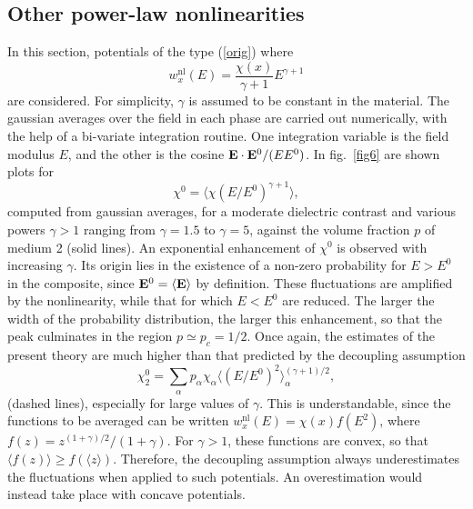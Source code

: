 \subsection{Other power-law nonlinearities}
In this section, potentials of the type (\ref{orig}) 
where \cite{AHAR87}
\begin{equation}
w^{\text{nl}}_x(E)=\frac{\chi(x)}{\gamma+1}E^{\gamma+1}
\end{equation}
are considered. For simplicity, $\gamma$ is assumed to be 
constant in the material. The gaussian averages over the 
field in each phase are carried out numerically, with the 
help of a bi-variate integration routine. One integration 
variable is the field modulus $E$, and the other is the 
cosine ${\mathbf E}\cdot{\bf E}^0/(E E^0)$. In fig.\ 
\ref{fig6} are shown plots for \begin{equation}
\label{directg}
\chi^0=\langle\chi (E/E^0)^{\gamma+1}\rangle,
\end{equation}
computed from gaussian averages, for a moderate 
dielectric contrast and various powers $\gamma>1$ 
ranging from $\gamma=1.5$ to $\gamma=5$, against 
the volume fraction $p$ of medium 2 (solid lines). 
An exponential enhancement of $\chi^0$ is observed 
with increasing $\gamma$. Its origin lies in the 
existence of a non-zero probability for $E>E^0$ 
in the composite, since ${\bf E}^0=\langle{\bf E}\rangle$ 
by definition. These fluctuations are amplified by the 
nonlinearity, while that for which $E<E^0$ are reduced. 
The larger the width of the probability distribution, 
the larger this enhancement, so that the peak 
culminates in the region $p\simeq p_c=1/2$. Once 
again, the estimates of the present theory are much 
higher than that predicted by the decoupling assumption 
\begin{equation}
\label{decouplg}
\chi^0_2=\sum_\alpha p_\alpha \chi_\alpha \langle(E/E^0)^{2}
\rangle_\alpha^{(\gamma+1)/2},
\end{equation}
(dashed lines), especially for large values of $\gamma$. 
This is understandable, since the functions to be averaged can 
be written $w_x^{\text{nl}}(E)=\chi(x)f(E^2)$, where 
$f(z)=z^{(1+\gamma)/2}/(1+\gamma)$. For $\gamma>1$, these functions 
are convex, so that $\langle f(z)\rangle\geq f(\langle z\rangle)$.
 Therefore, the decoupling assumption always underestimates the 
fluctuations when applied to such potentials. An overestimation 
would instead take place with concave potentials.

